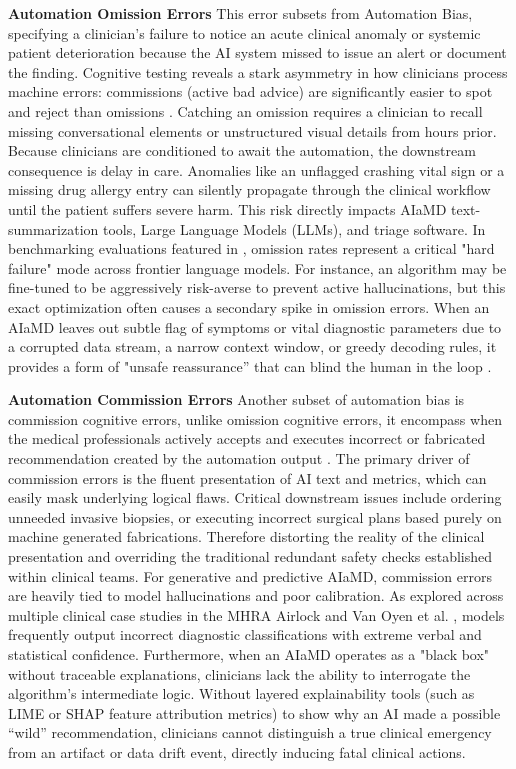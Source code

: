 \documentclass[11pt,a4paper]{article}
\begin{document}
\textbf{Automation Omission Errors}
This error subsets from Automation Bias, specifying a clinician's failure to notice an acute clinical anomaly or systemic patient deterioration because the AI system missed to issue an alert or document the finding. Cognitive testing reveals a stark asymmetry in how clinicians process machine errors: commissions (active bad advice) are significantly easier to spot and reject than omissions \cite{parasuraman2010complacency} . Catching an omission requires a clinician to recall missing conversational elements or unstructured visual details from hours prior. Because clinicians are conditioned to await the automation, the downstream consequence is  delay in care. Anomalies like an unflagged crashing vital sign or a missing drug allergy entry can silently propagate through the clinical workflow until the patient suffers severe harm.
This risk directly impacts AIaMD text-summarization tools, Large Language Models (LLMs), and triage software. In benchmarking evaluations featured in \cite{vanoyen2026} , omission rates represent a critical "hard failure" mode across frontier language models. For instance, an algorithm may be fine-tuned to be aggressively risk-averse to prevent active hallucinations, but this exact optimization often causes a secondary spike in omission errors. When an AIaMD leaves out subtle flag of symptoms or vital diagnostic parameters due to a corrupted data stream, a narrow context window, or greedy decoding rules, it provides a form of "unsafe reassurance” that can  blind the human in the loop \cite{parasuraman2010complacency} .

\textbf{Automation Commission Errors}
Another subset of automation bias is commission cognitive errors, unlike omission cognitive errors, it encompass when the medical professionals actively accepts and executes  incorrect or fabricated recommendation created by the automation output \cite{parasuraman2010complacency} . The primary driver of commission errors is the  fluent presentation of AI text and metrics, which can easily mask underlying logical flaws. Critical downstream issues include ordering unneeded invasive biopsies, or executing incorrect surgical plans based purely on machine generated fabrications. Therefore distorting the reality of the clinical presentation and overriding the traditional redundant safety checks established within clinical teams.
For generative and predictive AIaMD, commission errors are heavily tied to model hallucinations and poor calibration. As explored across multiple clinical case studies in the MHRA Airlock and Van Oyen et al. \cite{mhra2025} \cite{vanoyen2026} , models frequently output incorrect diagnostic classifications with extreme verbal and statistical confidence. Furthermore, when an AIaMD operates as a "black box" without traceable explanations, clinicians lack the ability to interrogate the algorithm's intermediate logic. Without layered explainability tools (such as LIME or SHAP feature attribution metrics) to show why an AI made a possible “wild” recommendation, clinicians cannot distinguish a true clinical emergency from an artifact or data drift event, directly inducing fatal clinical actions.
\end{document}
